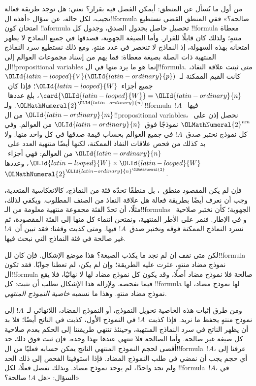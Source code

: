 \documentclass[../../../include/open-logic-section]{subfiles}
\begin{document}


من أول ما يُسأل عن المنطق: أيمكن الفصل فيه بقرار؟ نعني:
هل توجد طريقة فعالة تجيب، لكل حالة، عن سؤال «أهذه
ال!!{formula} صالحة؟» ففي المنطق القضي نستطيع امتحان
كون !!a{formula} تحصيل حاصل بجدول الصدق، وجدول كل
!!{formula} معطاة منتهٍ؛ ولذلك كان قابلًا للقرار.
وأما الصيغة الجهوية، فصدقها في جميع النماذج لا يظهر
امتحانه بهذه السهولة، إذ النماذج لا تنحصر في عدد منتهٍ.
ومع ذلك نستطيع سرد النماذج المنتهية ذات الصلة بصيغة معطاة:
فما يهم من إسناد مجموعات العوالم إلى ال!!{propositional variable}s
إنما هو ما يرد منها في ال!!{formula}. متى ثبتت علاقة
النفاذ، كانت القيم الممكنة لـ~$\OLId{latin-looped}{V}(\OLId{latin-ordinary}{p})$ جميع أجزاء~$\OLId{latin-looped}{W}$؛
فإذا كان~$\card{\OLId{latin-looped}{W}}=\OLId{latin-ordinary}{n}$، بلغ عددها~$\OLMathNumeral{2}^\OLId{latin-ordinary}{n}$. ولـ!!{formula}~$!A$
فيها~$\OLId{latin-ordinary}{m}$ من ال!!{propositional
  variable}s، نحصل إذن على~$\OLMathNumeral{2}^{nm}$ نموذجًا فوق~$\OLId{latin-ordinary}{n}$
من العوالم. وفي كل نموذج نختبر صدق~$!A$ في جميع
العوالم بحساب قيمة صدقها في كل واحد منها. ولا بد كذلك
من فحص علاقات النفاذ الممكنة، لكنها أيضًا منتهية العدد
على~$\OLId{latin-ordinary}{n}$ من العوالم: فهي أجزاء~$\OLId{latin-looped}{W} \times \OLId{latin-looped}{W}$،
وعددها~$\OLMathNumeral{2}^{\OLId{latin-ordinary}{n}^\OLMathNumeral{2}}$.

فإن لم يكن المقصود منطق~، بل منطقًا تحدّه
فئة من النماذج، كالانعكاسية المتعدية، وجب أن نعرف أيضًا
بطريقة فعالة هل علاقة النفاذ من الصنف المطلوب. ويكفي
لذلك، مثلًا، أن تحدّ الفئة مجموعة منتهية معلومة من
الـ!!{formula}s الجهوية؛ كأن نختبر صلاحية~
و في الإطار.
فنمر على الأطر المنتهية، ونمتحن انتماء كل منها إلى
الفئة المقصودة، ثم نسرد النماذج الممكنة فوقه ونختبر
صدق~$!A$ فيها. ومتى كذبت وقفنا: فقد تبين أن~$!A$
غير صالحة في فئة النماذج التي نبحث فيها.

لكن متى نقف إن لم نجد ما يكذب الصيغة؟ هذا موضع
الإشكال. فإن كان لل!!{formula} نموذج مضاد منتهٍ،
عثرت عليه الطريقة؛ وإن لم يكن، لم تعطنا جوابًا.
فقد تكون ال!!{formula} صالحة فلا نموذج مضاد أصلًا،
وقد يكون كل نموذج مضاد لها لا نهائيًا، فلا يقع
فيما نفحصه. ولإزالة هذا الإشكال نطلب أن نثبت:
كل !!{formula} لها نموذج مضاد، لها نموذج مضاد منتهٍ.
وهذا ما نسميه \emph{خاصية النموذج المنتهي}.

ومن طرق إثبات هذه الخاصية تحويل النموذج، أو النموذج
المضاد، اللانهائي لـ~$!A$ إلى نموذج منتهٍ يحفظ ما
نريد. فإذا كذبت~$!A$ في النموذج الأول، كذبت في
الناتج أيضًا؛ فلا بد أن يظهر الناتج في سرد النماذج
المنتهية، وحينئذ تنتهي طريقتنا إلى الحكم بعدم صلاحية
كل صيغة غير صالحة. وأما الصالحة فلا تنتهي عندها
بهذا وحده. فإن ثبت فوق ذلك حد أقصى لحجم النموذج
المنتهي الناتج يمكن حسابه فعليًا من ال!!{formula}~$!A$،
عرفنا إلى أي حجم يجب أن نمضي في طلب النموذج المضاد.
فإذا استوفينا الفحص إلى ذلك الحد ولم نجد واحدًا،
لم يوجد نموذج مضاد. وبذلك نفصل فعلًا، لكل
!!{formula}~$!A$، في السؤال: «هل $!A$ صالحة؟»
\end{document}
